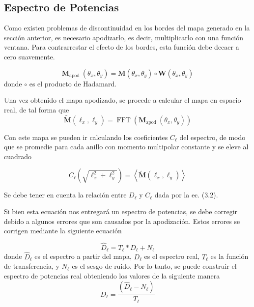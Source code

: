 \documentclass[twocolumn,letterpaper,spanish]{revtex4}
\numberwithin{equation}{section}
\begin{document}
\subsection{Espectro de Potencias}\label{espectro}

Como existen problemas de discontinuidad en los bordes del mapa generado en la secci\'on anterior, es necesario apodizarlo, es decir, multiplicarlo con una funci\'on ventana. Para contrarrestar el efecto de los bordes, esta funci\'on debe decaer a cero suavemente. 

\begin{equation}
\mathbf{M}_{\text {apod }}\left(\theta_{x}, \theta_{y}\right)=\mathbf{M}\left(\theta_{x}, \theta_{y}\right) \circ \mathbf{W}\left(\theta_{x}, \theta_{y}\right)
\end{equation}
donde $\circ$ es el producto de Hadamard.

Una vez obtenido el mapa apodizado, se procede a calcular el mapa en espacio real, de tal forma que
\begin{equation}
\tilde{\mathbf{M}}\left(\ell_{x}, \ell_{y}\right)=\operatorname{FFT}\left(\mathbf{M}_{\text {apod }}\left(\theta_{x}, \theta_{y}\right)\right)
\end{equation}

Con este mapa se pueden ir calculando los coeficientes $C_\ell$ del espectro, de modo que se promedie para cada anillo con momento multipolar constante y se eleve al cuadrado 

\begin{equation}
C_{\ell}\left(\sqrt{\ell_{x}^{2}+\ell_{y}^{2}}\right)=\left\langle\tilde{\mathbf{M}}\left(\ell_{x}, \ell_{y}\right)\right\rangle
\end{equation}

Se debe tener en cuenta la relaci\'on entre $D_{\ell}$ y $C_{\ell}$ dada por la ec. (3.2).

Si bien esta ecuaci\'on nos entregar\'a un espectro de potencias, se debe corregir debido a algunos errores que son causados por la apodizaci\'on. Estos errores se corrigen mediante la siguiente ecuaci\'on

\begin{equation}
\hat{D}_{\ell}=T_{\ell} * D_{\ell}+N_{\ell}
\end{equation}
donde $\hat{D}_{\ell}$ es el espectro a partir del mapa, $D_{\ell}$ es el espectro real, $T_{\ell}$ es la funci\'on de transferencia, y $N_{\ell}$ es el sesgo de ruido.
Por lo tanto, se puede construir el espectro de potencias real obteniendo los valores de la siguiente manera
\begin{equation}
D_{\ell}=\frac{\left(\hat{D}_{\ell}-N_{\ell}\right)}{T_{\ell}}
\end{equation}
\end{document}
